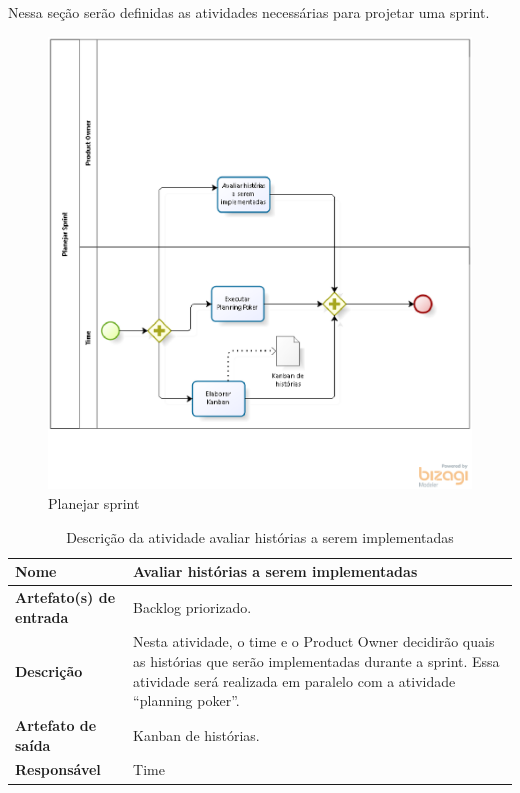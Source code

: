 \begin{enumerate}
    Nessa seção serão definidas as atividades necessárias para projetar uma sprint.
    \begin{figure}[H]
        \centering
        \caption{Planejar sprint}
        \label{processoPlanejar}
        \includegraphics[keepaspectratio=true,scale=0.5]{figuras/processoPlanejar.eps}
    \end{figure}

    \begin{table}[H]
        \centering
        \label{descricaoAtividades19}
        \caption{Descrição da atividade avaliar histórias a serem implementadas}
            \begin{tabular}{|l|p{10cm}|}
            \hline
            \textbf{Nome} & Avaliar histórias a serem implementadas \\
            \hline
            \textbf{Artefato(s) de entrada} & Backlog priorizado. \\
            \hline
            \textbf{Descrição} & Nesta atividade, o time e o Product Owner decidirão quais as histórias que serão implementadas durante a sprint. Essa atividade será realizada em paralelo com a atividade “planning poker”. \\
            \hline
            \textbf{Artefato de saída} & Kanban de histórias. \\
            \hline
            \textbf{Responsável} & Time \\
            \hline
        \end{tabular}
    \end{table}


\end{enumerate}
